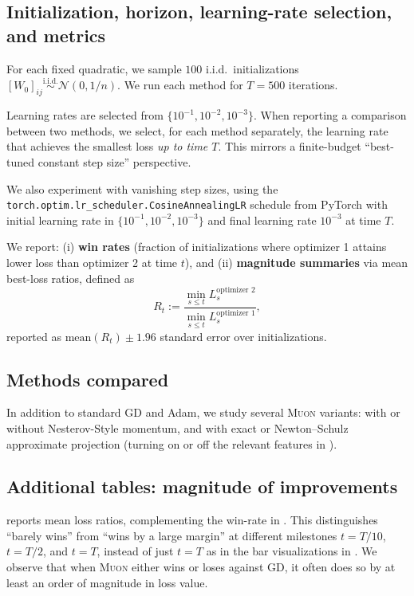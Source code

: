 \documentclass{article}
\theoremstyle{plain}
\theoremstyle{definition}
\theoremstyle{remark}
\newcommand{\loss}{L}
\newcommand{\GD}{\textsc{GD}}
\newcommand{\Muon}{\textsc{Muon}}
\begin{document}
\subsection{Initialization, horizon, learning-rate selection, and metrics}
\label{app:controlled-spectrum-protocol}

For each fixed quadratic, we sample $100$ i.i.d.\ initializations
$[W_0]_{ij}\overset{\text{i.i.d.}}{\sim}\mathcal N(0,1/n)$. 
We run each method for $T=500$ iterations.

Learning rates are selected from $\{10^{-1},10^{-2},10^{-3}\}$.
When reporting a comparison between two methods,
we select, for each method separately, the learning rate that achieves the smallest loss \emph{up to time $T$}. 
This mirrors a finite-budget ``best-tuned constant step size'' perspective. 

We also experiment with vanishing step sizes, using the \texttt{torch.optim.lr\_scheduler.CosineAnnealingLR} schedule from PyTorch with initial learning rate in $\{10^{-1},10^{-2},10^{-3}\}$ and final learning rate $10^{-3}$ at time $T$.

We report:
(i) \textbf{win rates} (fraction of initializations where optimizer 1 attains lower loss than optimizer 2 at time $t$),
and (ii) \textbf{magnitude summaries} via mean best-loss ratios, defined as
\[
R_t := \frac{\min_{s\leq t }\loss^{\text{optimizer 2}}_s}{\min_{s\leq t}\loss^{\text{optimizer 1}}_s},
\]
reported as $\mathrm{mean}(R_t)\pm 1.96$ standard error over initializations.

\subsection{Methods compared}
\label{app:controlled-spectrum-methods}

In addition to standard \GD{} and Adam, we study several \Muon{} variants: with or without Nesterov-Style momentum, and with exact or Newton--Schulz approximate projection (turning on or off the relevant features in ).

\subsection{Additional tables: magnitude of improvements}
\label{app:controlled-spectrum-magnitude}

 reports mean loss ratios,  complementing the win-rate in . 
This distinguishes ``barely wins'' from ``wins by a large margin'' at different milestones $t=T/10$, $t=T/2$, and $t=T$, 
instead of just $t=T$ as in the bar visualizations in . 
We observe that when \Muon{} 
either wins or loses against \GD{}, it often does so by at least an order of magnitude in loss value. 
\end{document}
